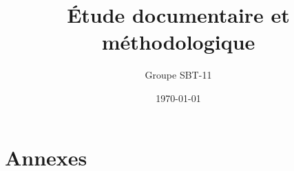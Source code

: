 \documentclass[12pt,oneside,a4paper]{article}
\title{\'Etude documentaire et m\'ethodologique}
\author{Groupe SBT-11}
\date{\today}
\begin{document}
\maketitle



\newpage

\newpage

\newpage

\newpage

\newpage

\newpage

\newpage

\newpage


\appendix
\part*{Annexes}

\end{document}
